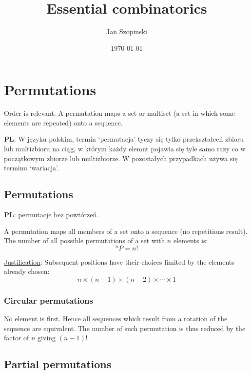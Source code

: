 \documentclass{article}
\newcommand{\pl}{\textbf{PL}: }
\begin{document}
\title{Essential combinatorics}
\author{Jan Szopinski}
\date{\frontdate\today}
\maketitle

\section{Permutations}

Order is relevant.
A permutation maps a set or multiset (a set in which some elements are repeated) onto a sequence.

\begin{otherlanguage}{polish}
    \pl
    W języku polskim, termin `permutacja' tyczy się tylko przekształceń zbioru lub multizbioru na ciąg, w którym każdy elemnt pojawia się tyle samo razy co w początkowym zbiorze lub multizbiorze.
    W pozostałych przypadkach używa się terminu `wariacja'.
\end{otherlanguage}

\subsection{Permutations}

\foreignlanguage{polish}{\pl permutacje bez powtórzeń.}

A permutation maps all members of a set onto a sequence (no repetitions result).
The number of all possible permutations of a set with $n$ elements is:
%
\begin{equation}
    ^nP = n!
\end{equation}

\underline{Justification}:
Subsequent positions have their choices limited by the elements already chosen:
%
\begin{equation*}
    n\times(n-1)\times(n-2)\times \dotsb \times 1
\end{equation*}

\subsubsection{Circular permutations}

No element is first.
Hence all sequences which result from a rotation of the sequence are equivalent.
The number of such permutation is thus reduced by the factor of $n$ giving ${(n-1)!}$

\subsection{Partial permutations}
\end{document}
